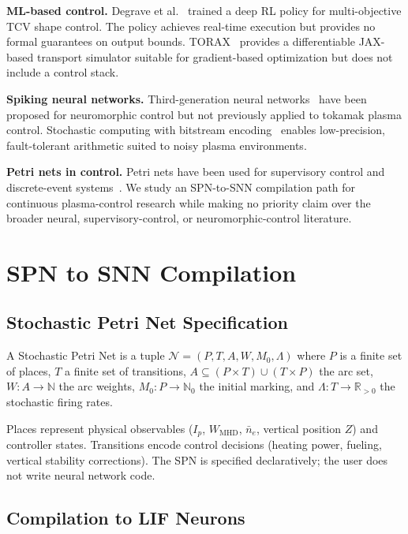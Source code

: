 \documentclass[twocolumn,preprintnumbers,amsmath,amssymb,prl,floatfix]{revtex4-2}
\begin{document}
\textbf{ML-based control.}\quad
Degrave et al.~\cite{degrave2022} trained a deep RL policy for
multi-objective TCV shape control.  The policy achieves real-time
execution but provides no formal guarantees on output bounds.
TORAX~\cite{fanni2024torax} provides a differentiable JAX-based
transport simulator suitable for gradient-based optimization but does
not include a control stack.

\textbf{Spiking neural networks.}\quad
Third-generation neural networks~\cite{maass1997} have been proposed
for neuromorphic control but not previously applied to tokamak plasma
control.  Stochastic computing with bitstream
encoding~\cite{alaghi2013} enables low-precision, fault-tolerant
arithmetic suited to noisy plasma environments.

\textbf{Petri nets in control.}\quad
Petri nets have been used for supervisory control and discrete-event
systems~\cite{murata1989}.  We study an SPN-to-SNN compilation path for
continuous plasma-control research while making no priority claim over the
broader neural, supervisory-control, or neuromorphic-control literature.


\section{SPN to SNN Compilation}
\label{sec:compilation}

\subsection{Stochastic Petri Net Specification}

A Stochastic Petri Net is a tuple
$\mathcal{N} = (P, T, A, W, M_0, \Lambda)$
where $P$ is a finite set of places, $T$ a finite set of transitions,
$A \subseteq (P \times T) \cup (T \times P)$ the arc set,
$W: A \to \mathbb{N}$ the arc weights,
$M_0: P \to \mathbb{N}_0$ the initial marking, and
$\Lambda: T \to \mathbb{R}_{>0}$ the stochastic firing rates.

Places represent physical observables ($I_p$, $W_\mathrm{MHD}$,
$\bar{n}_e$, vertical position $Z$) and controller states.
Transitions encode control decisions (heating power, fueling, vertical
stability corrections).  The SPN is specified declaratively; the user
does not write neural network code.

\subsection{Compilation to LIF Neurons}
\label{sec:lif}
\end{document}
